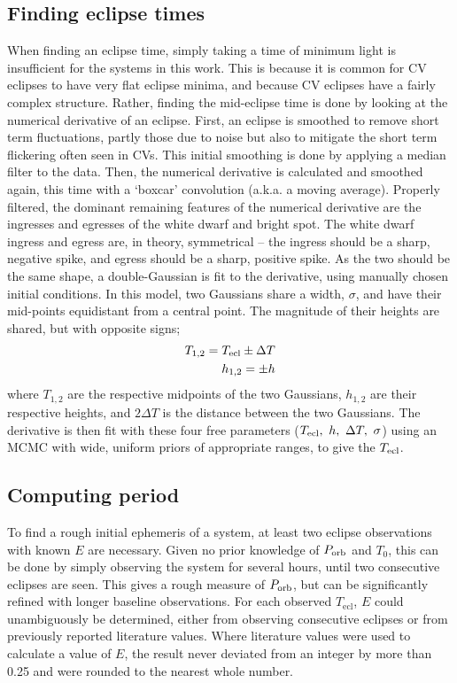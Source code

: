\subsection{Finding eclipse times}
\label{sect:modelling:finding eclipse times}

When finding an eclipse time, simply taking a time of minimum light is insufficient for the systems in this work. This is because it is common for CV eclipses to have very flat eclipse minima, and because CV eclipses have a fairly complex structure.
Rather, finding the mid-eclipse time is done by looking at the numerical derivative of an eclipse.
First, an eclipse is smoothed to remove short term fluctuations, partly those due to noise but also to mitigate the short term flickering often seen in CVs. This initial smoothing is done by applying a median filter to the data. Then, the numerical derivative is calculated and smoothed again, this time with a `boxcar' convolution (a.k.a. a moving average). Properly filtered, the dominant remaining features of the numerical derivative are the ingresses and egresses of the white dwarf and bright spot.
The white dwarf ingress and egress are, in theory, symmetrical -- the ingress should be a sharp, negative spike, and egress should be a sharp, positive spike. As the two should be the same shape, a double-Gaussian is fit to the derivative, using manually chosen initial conditions. In this model, two Gaussians share a width, $\sigma$, and have their mid-points equidistant from a central point. The magnitude of their heights are shared, but with opposite signs;
\begin{align*}
    T_{\rm 1,2} = T_{\rm ecl} \pm \Delta T \\
    h_{\rm 1,2} = \pm h
\end{align*}
where $T_{1,2}$ are the respective midpoints of the two Gaussians, $h_{1,2}$ are their respective heights, and $2\Delta T$ is the distance between the two Gaussians.
The derivative is then fit with these four free parameters ($T_{\rm ecl},\ h,\ \Delta T,\ \sigma$) using an MCMC with wide, uniform priors of appropriate ranges, to give the $T_{\rm ecl}$.

\subsection{Computing period}
\label{sect:modelling:Computing ephemeris}

To find a rough initial ephemeris of a system, at least two eclipse observations with known $E$ are necessary. Given no prior knowledge of $P_{\rm orb}$ and $T_0$, this can be done by simply observing the system for several hours, until two consecutive eclipses are seen. This gives a rough measure of $P_{\rm orb}$, but can be significantly refined with longer baseline observations.
For each observed $T_\mathrm{ecl}$, $E$ could unambiguously be determined, either from observing consecutive eclipses or from previously reported literature values. Where literature values were used to calculate a value of $E$, the result never deviated from an integer by more than 0.25 and were rounded to the nearest whole number.


